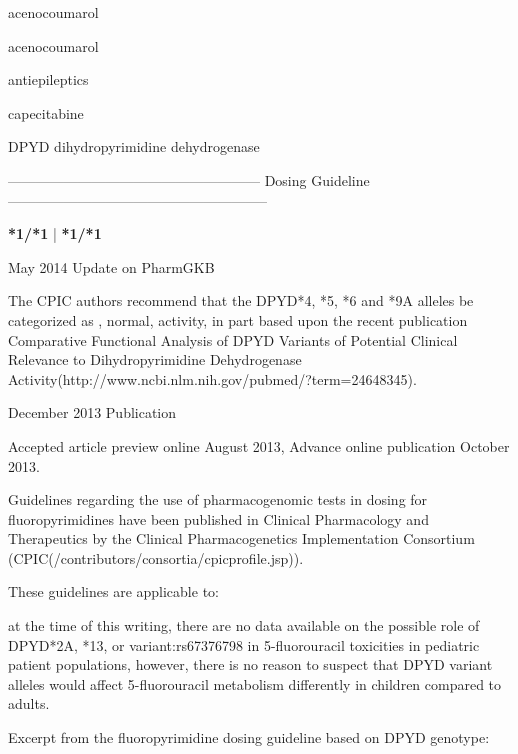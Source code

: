 \documentclass{resume} %
\begin{document}
\begin{rSection}{ acenocoumarol }
\begin{rSection}{ acenocoumarol }
\begin{rSection}{ antiepileptics }
\end{rSection}\begin{rSection}{ capecitabine }
\item[]
\begin{rSubsection}{ DPYD }{ dihydropyrimidine dehydrogenase }{}{}
\item[]
\item[] ------------------------------------------------------ Dosing Guideline --------------------------------------------------------\newline
\item[]
\item[] \textbf{ *1/*1 } | \textbf{ *1/*1 }
\item May 2014 Update on PharmGKB
 \newline
\item The CPIC authors recommend that the DPYD*4, *5, *6 and *9A alleles be categorized as , normal,  activity, in part based upon the recent publication Comparative Functional Analysis of DPYD Variants of Potential Clinical Relevance to Dihydropyrimidine Dehydrogenase Activity(http://www.ncbi.nlm.nih.gov/pubmed/?term=24648345). 
 \newline
\item December 2013 Publication
 \newline
\item Accepted article preview online August 2013,  Advance online publication October 2013.
 \newline
\item Guidelines regarding the use of pharmacogenomic tests in dosing for fluoropyrimidines have been published in Clinical Pharmacology and Therapeutics by the Clinical Pharmacogenetics Implementation Consortium (CPIC(/contributors/consortia/cpicprofile.jsp)).
 \newline
\item These guidelines are applicable to:
 \newline
\item at the time of this writing, there are no data available on the possible role of DPYD*2A, *13, or variant:rs67376798 in 5-fluorouracil toxicities in pediatric patient populations,  however, there is no reason to suspect that DPYD variant alleles would affect 5-fluorouracil metabolism differently in children compared to adults.
 \newline
\item Excerpt from the fluoropyrimidine dosing guideline based on DPYD genotype:
 \newline

\end{rSubsection}
\end{rSection}
\end{rSection}
\end{rSection}
\end{document}
